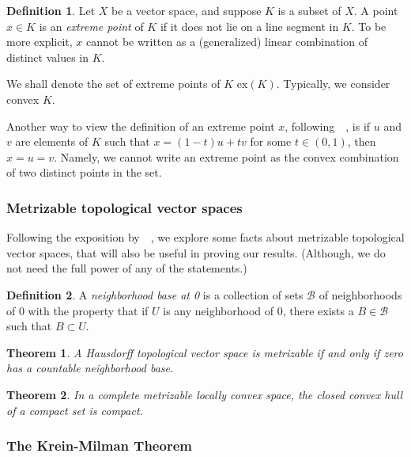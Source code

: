 \documentclass[12pt,letterpaper,final]{article}
\theoremstyle{plain}
\newtheorem{theorem}{Theorem}[section]
\theoremstyle{plain}
\theoremstyle{plain}
\theoremstyle{plain}
\theoremstyle{plain}
\theoremstyle{plain}
\theoremstyle{plain}
\theoremstyle{definition}
\newtheorem{definition}{Definition}[section]
\theoremstyle{definition}
\theoremstyle{definition}
\theoremstyle{definition}
\theoremstyle{definition}
\theoremstyle{remark}
\theoremstyle{remark}
\theoremstyle{remark}
\theoremstyle{remark}
\begin{document}
\begin{definition}
  Let \(X\) be a vector space, and suppose \(K\) is a subset of   \(X\). A point \(x\in K\) is an \emph{extreme point} of \(K\) if it
  does not lie on a line segment in \(K\). To be more explicit, \(x\)
  cannot be written as a (generalized) linear combination of distinct
  values in \(K\). 
\end{definition}

We shall denote the set of extreme points of \(K\)
\(\text{ex}(K)\). Typically, we consider convex \(K\). 

Another way to view the definition of an extreme point \(x\),
following~\citeauthor{Bowers14}~\cite{Bowers14}, is if \(u\) and \(v\)
are elements of \(K\)
such that \(x=(1-t)u+tv\) for some \(t\in(0,1)\), then
\(x=u=v\). Namely, we cannot write an extreme point as the convex
combination of two distinct points in the set.

  
\subsubsection{Metrizable topological vector spaces}
\label{sec:metr-topol-vect}

Following the exposition by~\citeauthor{AlBo06}~\cite{AlBo06}, we explore some facts about
metrizable topological vector spaces, that will also be useful in
proving our results. (Although, we do not need the full power of any
of the statements.) 

\begin{definition}
  A \emph{neighborhood base at 0} is a collection of sets \(\mathcal{B}\)
  of neighborhoods of \(0\)  with the property that if \(U\)
  is any neighborhood of \(0\), there exists a \(B\in \mathcal{B}\)
  such that \(B\subset U\).
\end{definition}

\begin{theorem}
  A Hausdorff topological vector space is metrizable if and
  only if zero has a countable neighborhood base.
\end{theorem}

\begin{theorem}
  In a complete metrizable locally convex space, the closed convex
  hull of a compact set is compact.
\end{theorem}


\subsubsection{The Krein-Milman Theorem}
\end{document}
